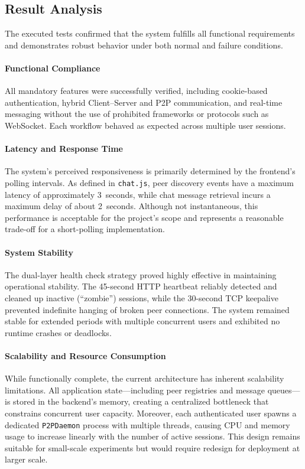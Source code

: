 \subsection{Result Analysis}

The executed tests confirmed that the system fulfills all functional requirements and demonstrates robust behavior under both normal and failure conditions.

\paragraph{Functional Compliance}
All mandatory features were successfully verified, including cookie-based authentication, hybrid Client–Server and P2P communication, 
and real-time messaging without the use of prohibited frameworks or protocols such as WebSocket. 
Each workflow behaved as expected across multiple user sessions.

\paragraph{Latency and Response Time}
The system’s perceived responsiveness is primarily determined by the frontend’s polling intervals. 
As defined in \texttt{chat.js}, peer discovery events have a maximum latency of approximately 3~seconds, while chat message retrieval incurs a maximum delay of about 2~seconds. 
Although not instantaneous, this performance is acceptable for the project’s scope and represents a reasonable trade-off for a short-polling implementation.

\paragraph{System Stability}
The dual-layer health check strategy proved highly effective in maintaining operational stability. 
The 45-second HTTP heartbeat reliably detected and cleaned up inactive (“zombie”) sessions, 
while the 30-second TCP keepalive prevented indefinite hanging of broken peer connections. 
The system remained stable for extended periods with multiple concurrent users and exhibited no runtime crashes or deadlocks.

\paragraph{Scalability and Resource Consumption}
While functionally complete, the current architecture has inherent scalability limitations. 
All application state—including peer registries and message queues—is stored in the backend’s memory, 
creating a centralized bottleneck that constrains concurrent user capacity. 
Moreover, each authenticated user spawns a dedicated \texttt{P2PDaemon} process with multiple threads, 
causing CPU and memory usage to increase linearly with the number of active sessions. 
This design remains suitable for small-scale experiments but would require redesign for deployment at larger scale.

